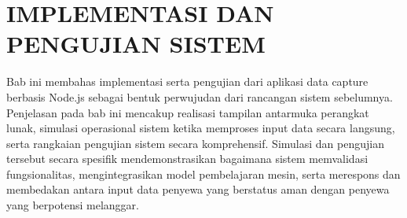 \chapter{IMPLEMENTASI DAN PENGUJIAN SISTEM}
\label{chap:implemtasiPL}

Bab ini membahas implementasi serta pengujian dari aplikasi {data capture} berbasis Node.js sebagai bentuk perwujudan dari rancangan sistem sebelumnya. Penjelasan pada bab ini mencakup realisasi tampilan antarmuka perangkat lunak, simulasi operasional sistem ketika memproses input data secara langsung, serta rangkaian pengujian sistem secara komprehensif. Simulasi dan pengujian tersebut secara spesifik mendemonstrasikan bagaimana sistem memvalidasi fungsionalitas, mengintegrasikan model pembelajaran mesin, serta merespons dan membedakan antara input data penyewa yang berstatus aman dengan penyewa yang berpotensi melanggar.



